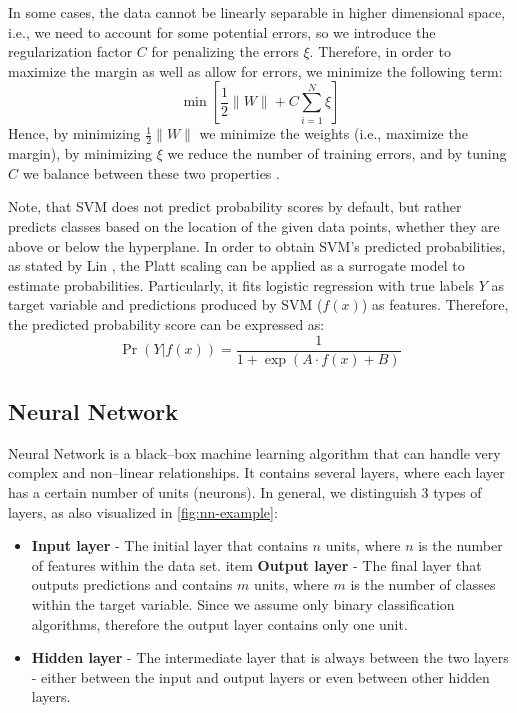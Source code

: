 In some cases, the data cannot be linearly separable in higher dimensional space, i.e., we need to account for some potential errors, so we introduce the regularization factor $C$ for penalizing the errors $\xi$.
Therefore, in order to maximize the margin as well as allow for errors, we minimize the following term:
\begin{equation}
    \min \left[\frac{1}{2} \|W\| + C \sum_{i=1}^{N} \xi\right]
\end{equation}
Hence, by minimizing $\frac{1}{2} \|W\|$ we minimize the weights (i.e., maximize the margin), by minimizing $\xi$ we reduce the number of training errors, and by tuning $C$ we balance between these two properties \citep{hsu2002comparison}.


Note, that SVM does not predict probability scores by default, but rather predicts classes based on the location of the given data points, whether they are above or below the hyperplane.
In order to obtain SVM's predicted probabilities, as stated by Lin \citep{lin2007note}, the Platt scaling \citep{platt1999probabilistic} can be applied as a surrogate model to estimate probabilities. Particularly, it fits logistic regression with true labels $Y$ as target variable and predictions produced by SVM ($f(x)$) as features. Therefore, the predicted probability score can be expressed as:
\begin{equation}
    \operatorname{Pr}\left(Y | f(x) \right) = \frac{1}{1 + \exp\left(A \cdot f(x) + B \right)} 
\end{equation}


\subsection{Neural Network}
\label{subssec:nn}
Neural Network is a black--box machine learning algorithm that can handle very complex and non--linear relationships. It contains several layers, where each layer has a certain number of units (neurons). In general, we distinguish 3 types of layers, as also visualized in \autoref{fig:nn-example}:
\begin{itemize}\setlength\itemsep{0em}
     \item \textbf{Input layer} - The initial layer that contains $n$ units, where $n$ is the number of features within the data set.
item \textbf{Output layer} - The final layer that outputs predictions and contains $m$ units, where $m$ is the number of classes within the target variable. Since we assume only binary classification algorithms, therefore the output layer contains only one unit.
 \item \textbf{Hidden layer} - The intermediate layer that is always between the two layers - either between the input and output layers or even between other hidden layers.
 \end{itemize}


